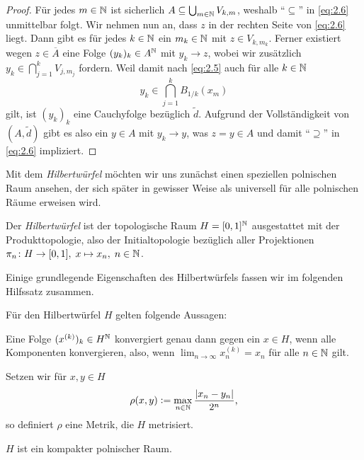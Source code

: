\documentclass[../main/main.tex]{subfiles}
\begin{document}
\begin{proof}
		Für jedes $m \in \mathbb{N}$ ist sicherlich $A \subseteq 
		\bigcup_{m \in \mathbb{N}} V_{k, m}$, weshalb \enquote{$\subseteq$} 
		in \eqref{eq:2.6} unmittelbar folgt.
		Wir nehmen nun an, dass $z$ in der rechten Seite von \eqref{eq:2.6} liegt. 
		Dann gibt es für jedes $k \in \mathbb{N}$ ein $m_k \in \mathbb{N}$ mit $z \in V_{k, m_k}$. 
		Ferner existiert wegen $z \in \overline{A}$ eine Folge $(y_k)_k \in A^{\mathbb{N}}$ 
		mit $y_k \to z$, wobei wir zusätzlich
		$y_k \in \bigcap_{j=1}^{k} V_{j, m_j}$
		fordern. Weil damit nach \eqref{eq:2.5} auch für alle $k \in \mathbb{N}$
		\[y_k \in \bigcap_{j=1}^{k} B_{1/k}(x_m)\]
		gilt, ist $(y_k)_k$ eine Cauchyfolge bezüglich $\tilde{d}$. Aufgrund der Vollständigkeit von 
		$(A, \tilde{d})$ gibt es also ein $y \in A$ mit $y_k \to y$, was 
		$z = y \in A$ und damit \enquote{$\supseteq$} 
		in \eqref{eq:2.6} impliziert.
	\end{proof}
	
	Mit dem \emph{Hilbertwürfel} möchten wir uns zunächst einen speziellen polnischen Raum ansehen, 
	der sich später in gewisser Weise als universell für alle polnischen Räume erweisen wird.
	
	\begin{Definition}[Hilbertwürfel]
		Der \emph{Hilbertwürfel} ist der topologische Raum $H = [0, 1]^{\mathbb{N}}$ 
		ausgestattet mit der Produkttopologie, also der Initialtopologie bezüglich 
		aller Projektionen $\pi_n \colon H \to [0, 1], \; x \mapsto x_n , \; n \in \mathbb{N}$.
	\end{Definition}

	Einige grundlegende Eigenschaften des Hilbertwürfels fassen wir im folgenden Hilfssatz zusammen.
	
	\begin{Hilfssatz}
		\label{lem:hilbertcube}
		Für den Hilbertwürfel $H$ gelten folgende Aussagen:
		\begin{enumeratethm}
			\item Eine Folge $(x^{(k)})_k \in H^{\mathbb{N}}$ konvergiert genau dann gegen 
			ein $x \in H$, wenn alle Komponenten konvergieren, also, wenn
			$\lim_{n \to \infty} x_n^{(k)} = x_n$ für alle $n \in \mathbb{N}$ gilt.
			\item Setzen wir für $x, y \in H$
			$$\rho(x, y) \vcentcolon = \max_{n \in \mathbb{N}} \frac{|x_n - y_n|}{2^n} \text{,}$$
			so definiert $\rho$ eine Metrik, die $H$ metrisiert.
			\item $H$ ist ein kompakter polnischer Raum.
		\end{enumeratethm}
	\end{Hilfssatz}
	
\end{document}
